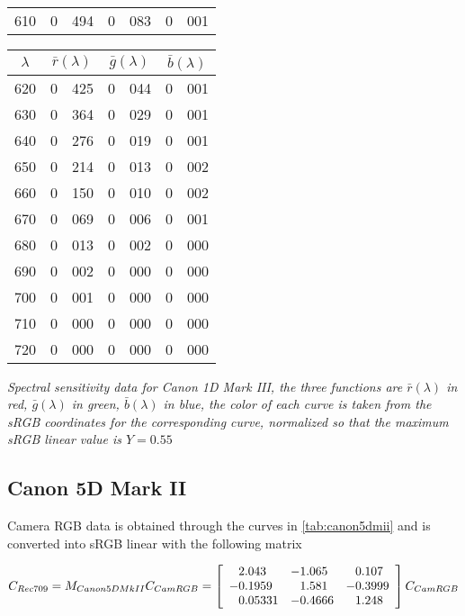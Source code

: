 {{\begin{minipage}{.3\textwidth}
\begin{tabular}{c|r@{.}l | r@{.}l | r@{.}l}
 610 &   0&494 &   0&083 &   0&001 \\
\end{tabular}
\end{minipage}\hfill
\begin{minipage}{.3\textwidth}
\centering
\begin{tabular}{c|r@{.}l | r@{.}l | r@{.}l}
$\lambda$ & \multicolumn{2}{c|}{$\bar r(\lambda)$} &  \multicolumn{2}{c|}{$\bar g(\lambda)$} &  \multicolumn{2}{c}{$\bar b(\lambda)$} \\
\hline
 620 &   0&425 &   0&044 &   0&001 \\
 630 &   0&364 &   0&029 &   0&001 \\
 640 &   0&276 &   0&019 &   0&001 \\
 650 &   0&214 &   0&013 &   0&002 \\
 660 &   0&150 &   0&010 &   0&002 \\
 670 &   0&069 &   0&006 &   0&001 \\
 680 &   0&013 &   0&002 &   0&000 \\
 690 &   0&002 &   0&000 &   0&000 \\
 700 &   0&001 &   0&000 &   0&000 \\
 710 &   0&000 &   0&000 &   0&000 \\
 720 &   0&000 &   0&000 &   0&000 \\
\end{tabular}
\end{minipage}

\vskip 1mm
}
\centering
{\footnotesize\it Spectral sensitivity data for Canon 1D Mark III, the three
functions
are $\bar r(\lambda)$ in red, $\bar g(\lambda)$ in green, $\bar b(\lambda)$ in blue,
the color of each curve is taken from the \gls{sRGB} coordinates for the
corresponding
curve, normalized so that the maximum \gls{sRGB} linear value is $Y = 0.55$
}
\label{tab:canon1dmiii}
}

\newpage

\subsection{Canon 5D Mark II}

Camera \gls{RGB} data is obtained through the curves in
\cref{tab:canon5dmii} and is converted into
\gls{sRGB} linear with the following matrix

\begin{displaymath}
C_{Rec709} = M_{Canon5DMkII} C_{CamRGB} = \left[\begin{array}{r@{.}lr@{.}lr@{.}l}
 2&043   & -1&065  &  0&107  \\
-0&1959  &  1&581  & -0&3999 \\
 0&05331 & -0&4666 &  1&248  \\
\end{array}\right] C_{CamRGB}
\end{displaymath}

